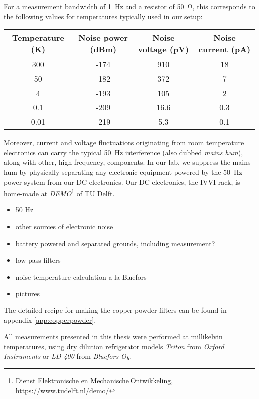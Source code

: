 For a measurement bandwidth of \SI{1}{\hertz} and a resistor of \SI{50}{\ohm}, this corresponds to the following values for temperatures typically used in our setup:

\begin{center}
\begin{tabular}{cccc}
	\hline \hline
	Temperature (\si{\kelvin}) & Noise power (\si{dBm}) & Noise voltage (\si{\pico\volt}) & Noise current (\si{\pico\ampere})\\ 
	\hline 
	300 & -174 & 910 & 18 \\ 
	50 & -182 & 372 & 7 \\ 
	4 & -193 & 105 & 2 \\ 
	0.1 & -209 & 16.6 & 0.3 \\ 
	0.01 & -219 & 5.3 & 0.1 \\ 
	\hline \hline
\end{tabular}
\end{center}

Moreover, current and voltage fluctuations originating from room temperature electronics can carry the typical \SI{50}{\hertz} interference (also dubbed \textit{mains hum}), along with other, high-frequency, components.
In our lab, we suppress the mains hum by physically separating any electronic equipment powered by the \SI{50}{\hertz} power system from our DC electronics.
Our DC electronics, the IVVI rack, is home-made at \textit{DEMO}\footnote{Dienst Elektronische en Mechanische Ontwikkeling, \url{https://www.tudelft.nl/demo/}} of TU Delft.

\begin{itemize}
	\item 50 Hz
	\item other sources of electronic noise
	\item battery powered and separated grounds, including measurement?
	\item low pass filters
	\item noise temperature calculation a la Bluefors
	\item pictures
\end{itemize}

The detailed recipe for making the copper powder filters can be found in appendix \ref{app:copperpowder}.

All measurements presented in this thesis were performed at millikelvin temperatures, using dry dilution refrigerator models \textit{Triton} from \textit{Oxford Instruments} or \textit{LD-400} from \textit{Bluefors Oy}.

